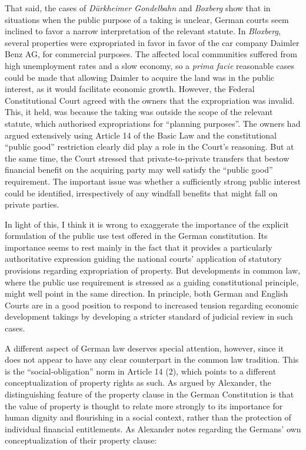 \documentclass[12pt,a4paper]{book} %
\begin{document}
That said, the cases of {\it D{\"u}rkheimer Gondelbahn} and {\it Boxberg} show that in situations when the public purpose of a taking is unclear, German courts seem inclined to favor a narrow interpretation of the relevant statute. In {\it Bloxberg}, several properties were expropriated in favor in favor of the car company Daimler Benz AG, for commercial purposes. The affected local communities suffered from high unemployment rates and a slow economy, so a {\it prima facie} reasonable cases could be made that allowing Daimler to acquire the land was in the public interest, as it would facilitate economic growth. However, the Federal Constitutional Court agreed with the owners that the expropriation was invalid. This, it held, was because the taking was outside the scope of the relevant statute, which authorised expropriations for ``planning purposes''. The owners had argued extensively using Article 14 of the Basic Law and the constitutional ``public good'' restriction clearly did play a role in the Court's reasoning. But at the same time, the Court stressed that private-to-private transfers that bestow financial benefit on the acquiring party may well satisfy the ``public good'' requirement. The important issue was whether a sufficiently strong public interest could be identified, irrespectively of any windfall benefits that might fall on private parties.

In light of this, I think it is wrong to exaggerate the importance of the explicit formulation of the public use test offered in the German constitution. Its importance seems to rest mainly in the fact that it provides a particularly authoritative expression guiding the national courts' application of statutory provisions regarding expropriation of property. But developments in common law, where the public use requirement is stressed as a guiding constitutional principle, might well point in the same direction. In principle, both German and English Courts are in a good position to respond to increased tension regarding economic development takings by developing a stricter standard of judicial review in such cases.

A different aspect of German law deserves special attention, however, since it does not appear to have any clear counterpart in the common law tradition. This is the  ``social-obligation'' norm in Article 14 (2), which points to a different conceptualization of property rights as such. As argued by Alexander, the distinguishing feature of the property clause in the German Constitution is that the value of property is thought to relate more strongly to its importance for human dignity and flourishing in a social context, rather than the protection of individual financial entitlements. As Alexander notes regarding the Germans' own conceptualization of their property clause:
\end{document}
